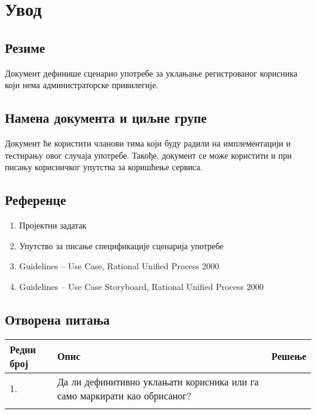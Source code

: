 \section{Увод}

\subsection{Резиме}

Документ дефинише сценарио употребе за уклањање регистрованог корисника који нема администраторске
привилегије.

\subsection{Намена документа и циљне групе}

Документ ће користити чланови тима који буду радили на имплементацији и тестирању овог случаја
употребе. Такође, документ се може користити и при писању корисничког упутства за коришћење
сервиса.

\subsection{Референце}

\begin{enumerate}
    \item Пројектни задатак
    \item Упутство за писање спецификације сценарија употребе
    \item Guidelines – Use Case, Rational Unified Process 2000
    \item Guidelines – Use Case Storyboard, Rational Unified Process 2000
\end{enumerate}

\subsection{Отворена питања}

\noindent
\setcellgapes{4pt}
\makegapedcells
\begin{tabularx}{\linewidth}{|l|X|X|}
    \hline
    \textbf{Редни број} & \textbf{Опис} & \textbf{Решење} \\
    \hline
    1. & Да ли дефинитивно уклањати корисника или га само маркирати као обрисаног? & \\
    \hline
    & & \\
    \hline
\end{tabularx}

